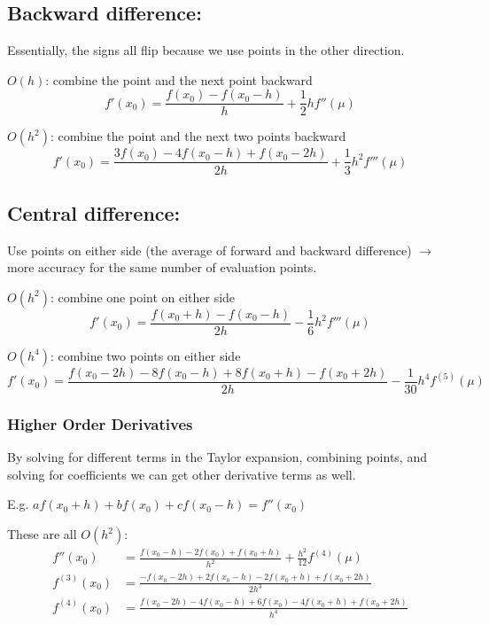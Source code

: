 \documentclass[12pt]{article}
\begin{document}
\subsection{Backward difference:}
Essentially, the signs all flip because we use points in the other direction.

\underline{$O(h)$}: combine the point and the next point backward
\[f'(x_0) = \frac{f(x_0) - f(x_0 - h)}{h} + \frac{1}{2}hf''(\mu)\]

\underline{$O(h^2)$}: combine the point and the next two points backward
%
\[f'(x_0) = \frac{3 f(x_0) - 4f(x_0 - h) + f(x_0 - 2h)}{2h} + \frac{1}{3}h^2 f'''(\mu)\]

\subsection{Central difference:}
Use points on either side (the average of forward and backward difference) $\rightarrow$ more accuracy for the same number of evaluation  points.

\underline{$O(h^2)$}: combine one point on either side
\[f'(x_0) = \frac{f(x_0 + h) - f(x_0 - h)}{2h} - \frac{1}{6}h^2 f'''(\mu)\]

\underline{$O(h^4)$}: combine two points on either side
\[f'(x_0) = \frac{f(x_0 - 2h) - 8f(x_0 - h) + 8f(x_0 + h) - f(x_0 + 2h)}{2h} - \frac{1}{30}h^4 f^{(5)}(\mu)\]

\subsubsection{Higher Order Derivatives}
By solving for different terms in the Taylor expansion, combining points, and solving for coefficients we can get other derivative terms as well. 

E.g. $a f(x_0 + h) + b f(x_0) + c f(x_0 - h) = f''(x_0)$

These are all $O(h^2)$:
\begin{align}
f''(x_0) &= \frac{f(x_0 - h) - 2f(x_0) + f(x_0 + h)}{h^2} + \frac{h^2}{12}f^{(4)}(\mu) \\
%
f^{(3)}(x_0) &= \frac{-f(x_0 - 2h) + 2f(x_0 - h) - 2f(x_0 + h) + f(x_0 + 2h)}{2h^3}\\
%
f^{(4)}(x_0) &= \frac{f(x_0 - 2h) - 4f(x_0 - h) +6f(x_0) - 4f(x_0 + h) + f(x_0 + 2h)}{h^4}
\end{align}
\end{document}
